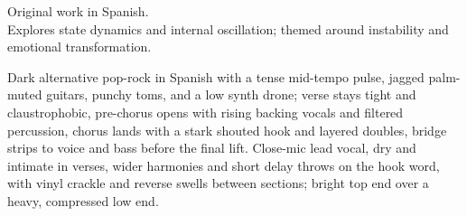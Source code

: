

\begin{notes}
Original work in Spanish.\\
Explores state dynamics and internal oscillation; themed around instability and emotional transformation.
\end{notes}

\begin{style}
Dark alternative pop-rock in Spanish with a tense mid-tempo pulse, jagged palm-muted guitars, punchy toms, and a low synth drone; verse stays tight and claustrophobic, pre-chorus opens with rising backing vocals and filtered percussion, chorus lands with a stark shouted hook and layered doubles, bridge strips to voice and bass before the final lift. %
Close-mic lead vocal, dry and intimate in verses, wider harmonies and short delay throws on the hook word, with vinyl crackle and reverse swells between sections; bright top end over a heavy, compressed low end.
\end{style}

